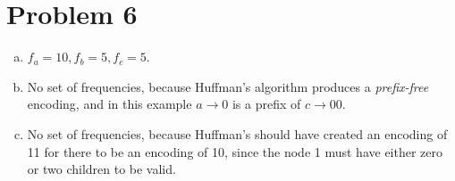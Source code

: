 \documentclass[11pt]{article}
\begin{document}
\newpage
\section*{Problem 6}
\begin{enumerate}[(a)]
\item $f_a=10,f_b=5,f_c=5$.
\item No set of frequencies, because Huffman's algorithm produces a \textit{prefix-free} encoding, and in this example $a\rightarrow0$ is a prefix of $c\rightarrow00$.
\item No set of frequencies, because Huffman's should have created an encoding of 11 for there to be an encoding of 10, since the node 1 must have either zero or two children to be valid.
\end{enumerate}
\end{document}
